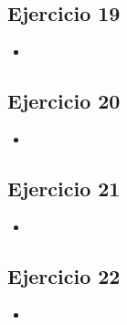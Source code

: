 \documentclass[10pt,a4paper]{article}
\begin{document}
\subsection{Ejercicio 19}
\begin{itemize}
\item
\end{itemize}


\subsection{Ejercicio 20}
\begin{itemize}
\item
\end{itemize}

\subsection{Ejercicio 21}
\begin{itemize}
\item
\end{itemize}

\subsection{Ejercicio 22}
\begin{itemize}
\item
\end{itemize}
\end{document}
